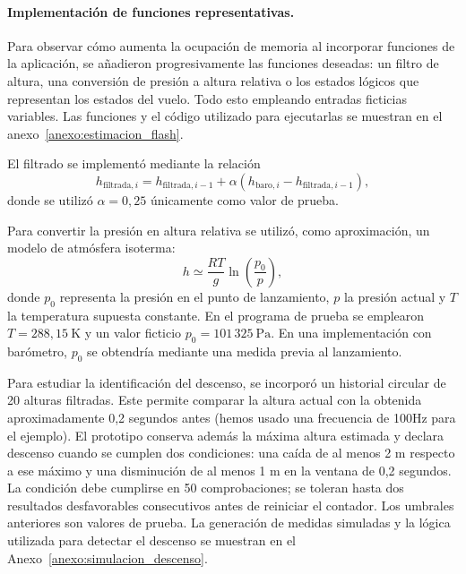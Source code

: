 \documentclass[11pt,a4paper]{article}
\begin{document}
\paragraph{Implementación de funciones representativas.}

Para observar cómo aumenta la ocupación de memoria al incorporar funciones
de la aplicación, se añadieron progresivamente las funciones deseadas: un filtro de altura, una
conversión de presión a altura relativa o los estados lógicos que representan los estados del vuelo. Todo esto empleando entradas ficticias
variables. Las funciones y el código utilizado para ejecutarlas se muestran
en el anexo~\ref{anexo:estimacion_flash}.

El filtrado se implementó mediante la relación
\begin{equation}
    h_{\mathrm{filtrada},i}
    =h_{\mathrm{filtrada},i-1}
    +\alpha\left(h_{\mathrm{baro},i}
    -h_{\mathrm{filtrada},i-1}\right),
\end{equation}
donde se utilizó $\alpha=0{,}25$ únicamente como valor de prueba.

Para convertir la presión en altura relativa se utilizó, como aproximación,
un modelo de atmósfera isoterma:
\begin{equation}
    h \simeq \frac{RT}{g}
    \ln\left(\frac{p_0}{p}\right),
\end{equation}
donde $p_0$ representa la presión en el punto de lanzamiento, $p$ la
presión actual y $T$ la temperatura supuesta constante. En el programa
de prueba se emplearon $T=288{,}15\ \mathrm{K}$ y un valor ficticio
$p_0=101\,325\ \mathrm{Pa}$. En una implementación con barómetro, $p_0$
se obtendría mediante una medida previa al lanzamiento.

Para estudiar la identificación del descenso, se incorporó un
historial circular de 20 alturas filtradas. Este permite comparar
la altura actual con la obtenida aproximadamente 0,2 segundos antes (hemos usado una frecuencia de 100Hz para el ejemplo).
El prototipo conserva además la máxima altura estimada y declara
descenso cuando se cumplen dos condiciones: una caída de al menos
2 m respecto a ese máximo y una disminución de al menos 1 m en la
ventana de 0,2 segundos. La condición debe cumplirse en 50
comprobaciones; se toleran hasta dos resultados desfavorables
consecutivos antes de reiniciar el contador. Los umbrales anteriores son valores de prueba. La generación de medidas simuladas y la lógica utilizada para
detectar el descenso se muestran en el
Anexo~\ref{anexo:simulacion_descenso}.
\end{document}
